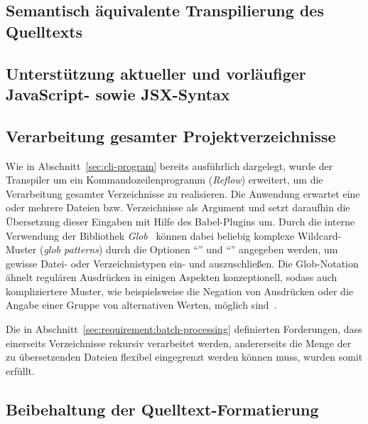 \subsection{Semantisch äquivalente Transpilierung des Quelltexts}


\subsection{Unterstützung aktueller und vorläufiger JavaScript- sowie JSX-Syntax}



\subsection{Verarbeitung gesamter Projektverzeichnisse}

Wie in Abschnitt~\ref{sec:cli-program} bereits ausführlich dargelegt, wurde der Transpiler um ein Kommandozeilenprogramm (\textit{Reflow}) erweitert, um die Verarbeitung gesamter Verzeichnisse zu realisieren. Die Anwendung erwartet eine oder mehrere Dateien bzw. Verzeichnisse als Argument und setzt daraufhin die Übersetzung dieser Eingaben mit Hilfe des Babel-Plugins um.
Durch die interne Verwendung der Bibliothek \textit{Glob}~\autocite{NPM:GLOB} können dabei beliebig komplexe Wildcard-Muster (\textit{glob patterns}) durch die Optionen \enquote{} und \enquote{} angegeben werden, um gewisse Datei- oder Verzeichnistypen ein- und auszuschließen. Die Glob-Notation ähnelt regulären Ausdrücken in einigen Aspekten konzeptionell, sodass auch kompliziertere Muster, wie beispielsweise die Negation von Ausdrücken oder die Angabe einer Gruppe von alternativen Werten, möglich sind~\autocite{MAN:GLOB}.

Die in Abschnitt~\ref{sec:requirement:batch-processing} definierten Forderungen, dass einerseits Verzeichnisse rekursiv verarbeitet werden, andererseits die Menge der zu übersetzenden Dateien flexibel eingegrenzt werden können muss, wurden somit erfüllt.

\subsection{Beibehaltung der Quelltext-Formatierung}

